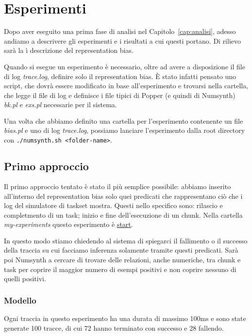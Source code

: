 \chapter{Esperimenti}
\label{cap:esperimenti}
Dopo aver eseguito una prima fase di analisi nel Capitolo~\ref{cap:analisi}, adesso andiamo a descrivere gli esperimenti e i risultati a cui questi portano. Di rilievo sarà la ì descrizione del representation bias.

\myskip

Quando si esegue un esperimento è necessario, oltre ad avere a disposizione il file di log \textit{trace.log}, definire solo il representation bias. È stato infatti pensato uno script, che dovrà essere modificato in base all'esperimento e trovarsi nella cartella, che legge il file di log e definisce i file tipici di Popper (e quindi di Numsynth) \textit{bk.pl} e \textit{exs.pl} necessarie per il sistema.

Una volta che abbiamo definito una cartella per l'esperimento contenente un file \textit{bias.pl} e uno di log \textit{trace.log}, possiamo lanciare l'esperimento dalla root directory con \texttt{./numsynth.sh <folder-name>}.

\section{Primo approccio}
\label{sec:primo-approccio}
Il primo approccio tentato è stato il più semplice possibile: abbiamo inserito all'interno del representation bias solo quei predicati che rappresentano ciò che i log del simulatore di taskset mostra. Questi nello specifico sono: rilascio e completmento di un task; inizio e fine dell'esecuzione di un chunk. Nella cartella \textit{my-experiments} questo esperimento è \href{https://github.com/edoardosarri24/numsynth/tree/main/my-experiments/1-start/}{start}.

In questo modo stiamo chiedendo al sistema di spiegarci il fallimento o il successo della traccia su cui facciamo inferenza solamente tramite questi predicati. Sarà poi Numsynth a cercare di trovare delle relazioni, anche numeriche, tra chunk e task per coprire il maggior numero di esempi positivi e non coprire nessuno di quelli positivi.

\subsection{Modello}
\label{subsec:mod-primo-approccio}
Ogni traccia in questo esperimento ha una durata di massimo 100ms e sono state generate 100 tracce, di cui 72 hanno terminato con successo e 28 fallendo.

